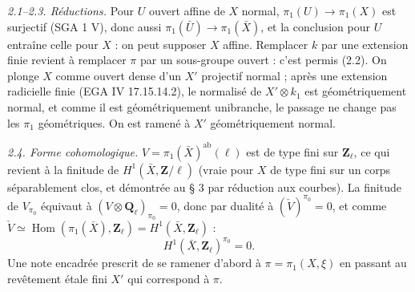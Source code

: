 \documentclass[11pt,a4paper]{article}
\begin{document}
\emph{2.1--2.3. Réductions.} Pour $U$ ouvert affine de $X$ normal,
$\pi_1(U) \to \pi_1(X)$ est surjectif (SGA 1 V), donc aussi
$\pi_1(\bar U) \to \pi_1(\bar X)$, et la conclusion pour $U$ entraîne celle pour
$X$ : on peut supposer $X$ affine. Remplacer $k$ par une extension finie revient
à remplacer $\pi$ par un sous-groupe ouvert : c'est permis (2.2). On plonge
$X$ comme ouvert dense d'un $X'$ projectif normal ; après une extension
radicielle finie (EGA IV 17.15.14.2), le normalisé de $X' \otimes k_1$ est
géométriquement normal, et comme il est géométriquement unibranche, le passage
ne change pas les $\pi_1$ géométriques. On est ramené à $X'$ géométriquement
normal.

\emph{2.4. Forme cohomologique.} $V = \pi_1(\bar X)^{\mathrm{ab}}(\ell)$ est de
type fini sur $\mathbf{Z}_\ell$, ce qui revient à la finitude de
$H^1(\bar X, \mathbf{Z}/\ell)$ (vraie pour $X$ de type fini sur un corps
séparablement clos, et démontrée au § 3 par réduction aux courbes). La finitude
de $V_{\pi_0}$ équivaut à $(V \otimes \mathbf{Q}_\ell)_{\pi_0} = 0$, donc par
dualité à $(\check V)^{\pi_0} = 0$, et comme $\check V \simeq
\operatorname{Hom}(\pi_1(\bar X), \mathbf{Z}_\ell) = H^1(\bar X, \mathbf{Z}_\ell)$ :
\[
  H^1(\bar X, \mathbf{Z}_\ell)^{\pi_0} = 0 . \tag{2.4.1}
\]
Une note encadrée prescrit de se ramener d'abord à $\pi = \pi_1(X,\xi)$ en
passant au revêtement étale fini $X'$ qui correspond à $\pi$.
\end{document}
